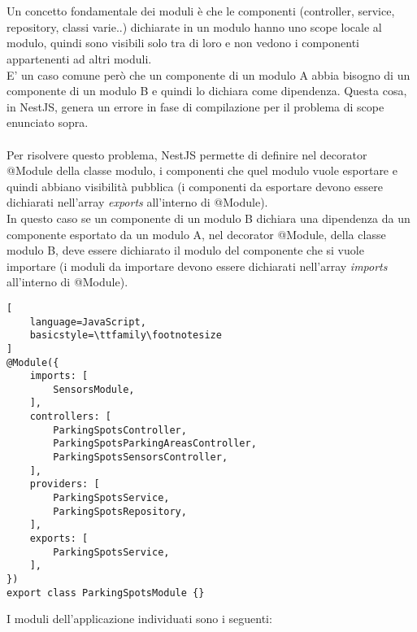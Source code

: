 \\\\
Un concetto fondamentale dei moduli è che le componenti (controller, service, repository, classi varie..) dichiarate 
in un modulo hanno uno scope locale al modulo, quindi sono visibili solo tra di loro e non vedono
i componenti appartenenti ad altri moduli.
\\
E' un caso comune però che un componente di un modulo A abbia bisogno di un componente di un modulo B
e quindi lo dichiara come dipendenza. Questa cosa, in NestJS, genera un errore in fase di compilazione per il problema
di scope enunciato sopra.
\\\\
Per risolvere questo problema, NestJS permette di definire nel decorator @Module della classe modulo, i componenti che
quel modulo vuole esportare e quindi abbiano visibilità pubblica (i componenti da esportare devono essere dichiarati 
nell'array \textit{exports} all'interno di @Module). 
\\
In questo caso se un componente di un modulo B dichiara una 
dipendenza da un componente esportato da un modulo A, nel decorator @Module, della classe modulo B, deve essere dichiarato il
modulo del componente che si vuole importare (i moduli da importare devono essere dichiarati nell'array \textit{imports} all'interno di @Module).
\\
\begin{lstlisting}[
    language=JavaScript,
    basicstyle=\ttfamily\footnotesize
]
@Module({
    imports: [ 
        SensorsModule,
    ],
    controllers: [
        ParkingSpotsController, 
        ParkingSpotsParkingAreasController,
        ParkingSpotsSensorsController,
    ],
    providers: [
        ParkingSpotsService,
        ParkingSpotsRepository,
    ],
    exports: [
        ParkingSpotsService,
    ],
})
export class ParkingSpotsModule {}
\end{lstlisting}
\leavevmode\newline
I moduli dell'applicazione individuati sono i seguenti:
